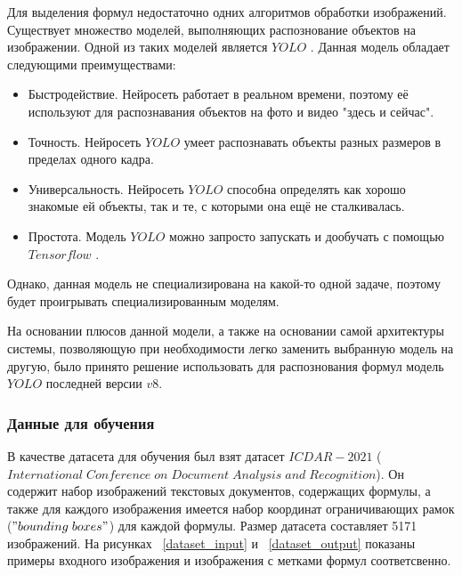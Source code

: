 Для выделения формул недостаточно одних алгоритмов обработки изображений. Существует множество моделей, выполняющих распознование объектов на изображении.
Одной из таких моделей является $YOLO$ \cite{yolo}. Данная модель обладает следующими преимуществами:
\begin{itemize}
    \item Быстродействие. Нейросеть работает в реальном времени, поэтому её используют для распознавания объектов на фото и видео "здесь и сейчас".
    \item Точность. Нейросеть $YOLO$ умеет распознавать объекты разных размеров в пределах одного кадра.
    \item Универсальность. Нейросеть $YOLO$ способна определять как хорошо знакомые ей объекты, так и те, с которыми она ещё не сталкивалась.
    \item Простота. Модель $YOLO$ можно запросто запускать и дообучать с помощью $Tensorflow$ \cite{tensorflow}.
\end{itemize}

Однако, данная модель не специализирована на какой-то одной задаче, поэтому будет проигрывать специализированным моделям.

На основании плюсов данной модели, а также на основании самой архитектуры системы, позволяющую при необходимости легко заменить выбранную модель на другую, было принято решение использовать для распознования формул модель $YOLO$ последней версии $v8$.

\subsubsection{Данные для обучения}

В качестве датасета для обучения был взят датасет $ICDAR-2021$ ($International\;Conference\;on\;Document\;Analysis\;and\;Recognition$). Он содержит набор изображений текстовых документов, содержащих формулы, 
а также для каждого изображения имеется набор координат ограничивающих рамок ($"bounding\; boxes"$) для каждой формулы.
Размер датасета составляет 5171 изображений.
На рисунках ~\ref{dataset_input} и ~\ref{dataset_output} показаны примеры входного изображения и изображения с метками формул соответсвенно.

